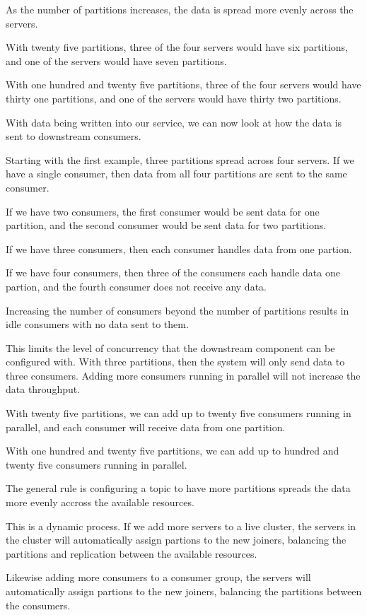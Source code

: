 \documentclass{article}
\begin{document}
As the number of partitions increases, the data is spread more evenly across the servers.

With twenty five partitions, three of the four servers would have six
partitions, and one of the servers would have seven partitions.

With one hundred and twenty five partitions, three of the four servers would have thirty one
partitions, and one of the servers would have thirty two partitions.


With data being written into our service, we can now look at
how the data is sent to downstream consumers.

Starting with the first example, three partitions spread across four servers.
If we have a single consumer, then data from all four partitions are sent to the
same consumer.

If we have two consumers, the first consumer would be sent data for one partition,
and the second consumer would be sent data for two partitions.

If we have three consumers, then each consumer handles data from one partion.

If we have four consumers, then three of the consumers each handle data one partion,
and the fourth consumer does not receive any data.

Increasing the number of consumers beyond the number of partitions
results in idle consumers with no data sent to them.

This limits the level of concurrency that the downstream component can be configured with.
With three partitions, then the system will only send data to three consumers.
Adding more consumers running in parallel will not increase the data throughput.

With twenty five partitions, we can add up to twenty five consumers running in parallel,
and each consumer will receive data from one partition.

With one hundred and twenty five partitions, we can add up to hundred and twenty five
consumers running in parallel.

The general rule is configuring a topic to have more partitions spreads the data more
evenly accross the available resources.

This is a dynamic process. If we add more servers to a live cluster, the servers in the cluster
will automatically assign partions to the new joiners, balancing the partitions
and replication between the available resources.

Likewise adding more consumers to a consumer group, the servers will automatically assign
partions to the new joiners, balancing the partitions between the consumers.
\end{document}
